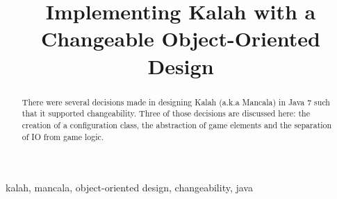 \documentclass[10pt, a4paper, conference]{IEEEtran}
\begin{document}
\title{Implementing Kalah with a Changeable Object-Oriented Design\\
}

\author{
}

\maketitle

\begin{abstract}
There were several decisions made in designing Kalah (a.k.a Mancala) in Java
  7 such that it supported changeability. Three of those decisions are
  discussed here: the creation of a configuration class, the abstraction of
  game elements and the separation of IO from game logic.
\end{abstract}

\begin{IEEEkeywords}
kalah, mancala, object-oriented design, changeability, java
\end{IEEEkeywords}

\end{document}
